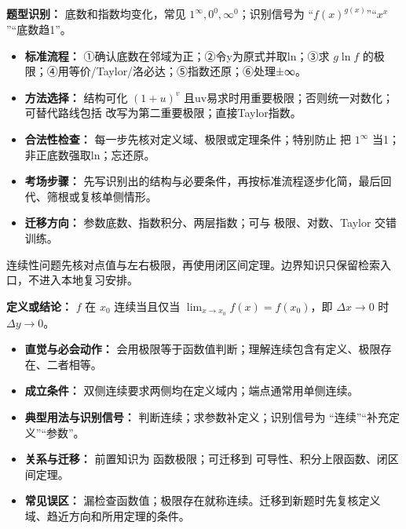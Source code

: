 \begin{knowledgeBox}
\textbf{题型识别：} 底数和指数均变化，常见 $1^\infty,0^0,\infty^0$；识别信号为 “$f(x)^{g(x)}$”“$x^x$”“底数趋1”。

\begin{itemize}
  \item \textbf{标准流程：} ①确认底数在邻域为正；②令y为原式并取ln；③求 $g\ln f$ 的极限；④用等价/Taylor/洛必达；⑤指数还原；⑥处理±∞。
  \item \textbf{方法选择：} 结构可化 $(1+u)^v$ 且uv易求时用重要极限；否则统一对数化；可替代路线包括 改写为第二重要极限；直接Taylor指数。
  \item \textbf{合法性检查：} 每一步先核对定义域、极限或定理条件；特别防止 把 $1^\infty$ 当1；非正底数强取ln；忘还原。
  \item \textbf{考场步骤：} 先写识别出的结构与必要条件，再按标准流程逐步化简，最后回代、筛根或复核单侧情形。
  \item \textbf{迁移方向：} 参数底数、指数积分、两层指数；可与 极限、对数、Taylor 交错训练。
\end{itemize}
\end{knowledgeBox}


\begin{knowledgeBox}
连续性问题先核对点值与左右极限，再使用闭区间定理。边界知识只保留检索入口，不进入本地复习安排。
\end{knowledgeBox}

\begin{knowledgeBox}
\textbf{定义或结论：} $f$ 在 $x_0$ 连续当且仅当 $\lim_{x\to x_0}f(x)=f(x_0)$，即 $\Delta x\to0$ 时 $\Delta y\to0$。

\begin{itemize}
  \item \textbf{直觉与必会动作：} 会用极限等于函数值判断；理解连续包含有定义、极限存在、二者相等。
  \item \textbf{成立条件：} 双侧连续要求两侧均在定义域内；端点通常用单侧连续。
  \item \textbf{典型用法与识别信号：} 判断连续；求参数补定义；识别信号为 “连续”“补充定义”“参数”。
  \item \textbf{关系与迁移：} 前置知识为 函数极限；可迁移到 可导性、积分上限函数、闭区间定理。
  \item \textbf{常见误区：} 漏检查函数值；极限存在就称连续。迁移到新题时先复核定义域、趋近方向和所用定理的条件。
\end{itemize}
\end{knowledgeBox}


